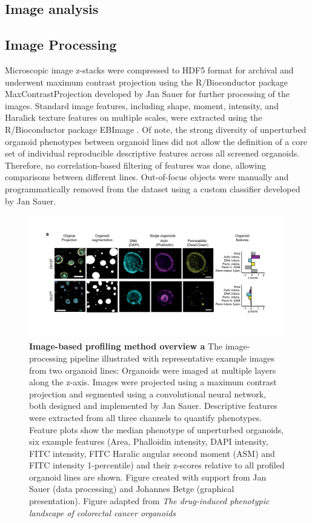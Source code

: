 \begin{flushleft}
\section{Image analysis}

\subsection{Image Processing}
Microscopic image z-stacks were compressed to HDF5 format for archival and underwent maximum contrast projection using the R/Bioconductor package MaxContrastProjection developed by Jan Sauer for further processing of the images. Standard image features, including shape, moment, intensity, and Haralick texture features on multiple scales, were extracted using the R/Bioconductor package EBImage \parencite{pauEBImagePackageImage2010}. Of note, the strong diversity of unperturbed organoid phenotypes between organoid lines did not allow the definition of a core set of individual reproducible descriptive features across all screened organoids. Therefore, no correlation-based filtering of features was done, allowing comparisons between different lines. Out-of-focus objects were manually and programmatically removed from the dataset using a custom classifier developed by Jan Sauer.

\begin{figure}[h]
\centering
\includegraphics[width=\textwidth,
                height=\textheight,
                keepaspectratio]{figures/promise/pdf/fig_1_2.pdf}
\caption[Image-based profiling method overview]{\textbf{Image-based profiling method overview a} The image-processing pipeline illustrated with representative example images from two organoid lines: Organoids were imaged at multiple layers along the z-axis. Images were projected using a maximum contrast projection and segmented using a convolutional neural network, both designed and implemented by Jan Sauer. Descriptive features were extracted from all three channels to quantify phenotypes. Feature plots show the median phenotype of unperturbed organoids, six example features (Area, Phalloidin intensity, DAPI intensity, FITC intensity, FITC Haralic angular second moment (ASM) and FITC intensity 1-percentile) and their z-scores relative to all profiled organoid lines are shown. Figure created with support from Jan Sauer (data processing) and Johannes Betge (graphical presentation). Figure adapted from \textit{The drug-induced phenotypic landscape of colorectal cancer organoids} \parencite{betgeDruginducedPhenotypicLandscape2022}}
\label{fig_135}
\end{figure}


\end{flushleft}
